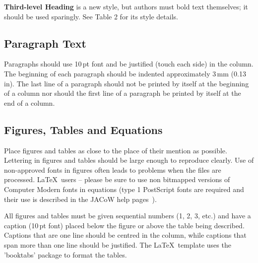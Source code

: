 \documentclass{JAC2003}
\begin{document}
\vspace*{6pt} {\bf Third-level Heading} is a new style, but authors must
bold text themselves; it should be used sparingly. See Table 2 for its
style details.

\subsection{Paragraph Text}

Paragraphs should use 10\,pt font and be justified (touch each side) in
the column. The beginning of each paragraph should be indented
approximately 3\,mm (0.13\,in). The last line of a paragraph should not be
printed by itself at the beginning of a column nor should the first line of
a paragraph be printed by itself at the end of a column.

\subsection{Figures, Tables and Equations}

Place figures and tables as close to the place of their mention as
possible. Lettering in figures and tables should be large enough to
reproduce clearly. Use of non-approved fonts in figures often leads to
problems when the files are processed. \LaTeX\ users -- please be sure to use non bitmapped
versions of Computer Modern fonts in equations (type 1 PostScript fonts are
required and their use is described in the JACoW help pages~\cite{jacow-help}).

All figures and tables must be given sequential numbers (1, 2, 3, etc.) and
have a caption (10\,pt font) placed below the figure or above the table being described.
Captions that are one line should be centred in the column, while captions
that span more than one line should be justified. The \LaTeX\ template uses the 'booktabs' 
package to format the tables.
\end{document}
